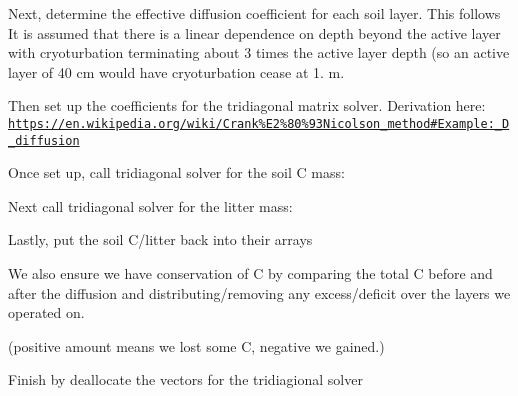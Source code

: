 Next, determine the effective diffusion coefficient for each soil layer. This follows \cite{Koven2011-796} It is assumed that there is a linear dependence on depth beyond the active layer with cryoturbation terminating about 3 times the active layer depth (so an active layer of 40 cm would have cryoturbation cease at 1. m.

Then set up the coefficients for the tridiagonal matrix solver. Derivation here\+: \href{https://en.wikipedia.org/wiki/Crank%E2%80%93Nicolson_method#Example:_1D_diffusion}{\tt https\+://en.\+wikipedia.\+org/wiki/\+Crank\%\+E2\%80\%93\+Nicolson\+\_\+method\#\+Example\+:\+\_\+1\+D\+\_\+diffusion}

Once set up, call tridiagonal solver for the soil C mass\+:

Next call tridiagonal solver for the litter mass\+:

Lastly, put the soil C/litter back into their arrays

We also ensure we have conservation of C by comparing the total C before and after the diffusion and distributing/removing any excess/deficit over the layers we operated on.

(positive amount means we lost some C, negative we gained.)

Finish by deallocate the vectors for the tridiagional solver 